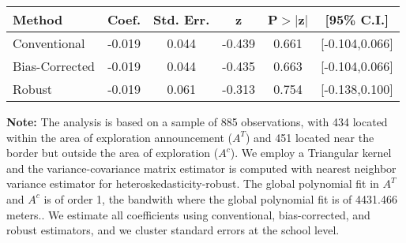 \begin{table}[htbp]\centering
 \footnotesize 
\begin{tabular}{lccccc}
\hline\hline
Method & Coef. & Std. Err. & z & P$>|$z$|$ & [95\% C.I.] \\ 
\hline \hline  
Conventional & -0.019 & 0.044 & -0.439 & 0.661 & [-0.104,0.066] \\ 
 Bias-Corrected & -0.019 & 0.044 & -0.435 & 0.663 & [-0.104,0.066] \\ 
Robust & -0.019 & 0.061 & -0.313 & 0.754 & [-0.138,0.100] \\ 
  \hline\hline
\end{tabular}
\label{table:rd}
\begin{tablenotes} 
  \justifying \tiny \textbf{Note: }    
   The analysis is based on a sample of 885 observations, with 434 located within the area of exploration announcement ($A^{T}$) and 451 located near the border but outside the area of exploration  ($A^{c}$). 
           We employ a Triangular kernel and the variance-covariance matrix estimator is computed with nearest neighbor variance estimator for heteroskedasticity-robust. The global polynomial fit in  $A^{T}$ and $A^{c}$ is of order 1, the bandwith where the global polynomial fit is of 4431.466 meters.. We estimate all coefficients using conventional, bias-corrected, and robust estimators, and we cluster standard errors at the school level. \end{tablenotes} 
 \end{table} 
